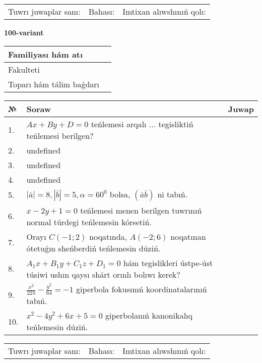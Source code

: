 \documentclass{article}
\begin{document}
\vspace{0.7cm}

\begin{tabular}{lll}
Tuwrı juwaplar sanı: \underline{\hspace{1cm}} & 
Bahası: \underline{\hspace{1cm}} & 
Imtixan alıwshınıń qolı: \underline{\hspace{2cm}} \\
\end{tabular}

\egroup

\newpage


\textbf{100-variant}\\

\bgroup
\def\arraystretch{1.6} %

\begin{tabular}{|m{5.7cm}|m{9.5cm}|}
\hline
Familiyası hám atı & \\
\hline
Fakulteti  & \\
\hline
Toparı hám tálim baǵdarı  & \\
\hline
\end{tabular}

\vspace{0.7cm}

\begin{tabular}{|m{0.7cm}|m{10cm}|m{4cm}|}
\hline
№ & Soraw & Juwap \\
\hline
1. & \(Ax + By + D = 0\) teńlemesi arqalı ... tegisliktiń teńlemesi berilgen? &  \\
\hline
2. & undefined &  \\
\hline
3. & undefined &  \\
\hline
4. & undefined &  \\
\hline
5. & \(\left| \bar{a} \right| = 8, \left| \bar{b} \right| = 5, \alpha = 60^{0}\) bolsa, \(( \bar{a}\bar{b} )\) ni tabıń. &  \\
\hline
6. & \(x - 2 y + 1 = 0\) teńlemesi menen berilgen tuwrınıń normal túrdegi teńlemesin kórsetiń. &  \\
\hline
7. & Orayı \(C (- 1;2)\) noqatında, \(A (- 2;6 )\) noqatınan ótetuǵın sheńberdiń teńlemesin dúziń. &  \\
\hline
8. & \(A_{1}x + B_{1}y + C_{1}z + D_{1} = 0\) hám tegislikleri ústpe-úst túsiwi ushın qaysı shárt orınlı bolıwı kerek? &  \\
\hline
9. & \(\frac{x^{2}}{225} - \frac{y^{2}}{64} = - 1\) giperbola fokusınıń koordinatalarınıń tabıń. &  \\
\hline
10. & \(x^{2} - 4 y^{2} + 6 x + 5 = 0\) giperbolanıń kanonikalıq teńlemesin dúziń. & \\
\hline
\end{tabular}

\vspace{0.7cm}

\begin{tabular}{lll}
Tuwrı juwaplar sanı: \underline{\hspace{1cm}} & 
Bahası: \underline{\hspace{1cm}} & 
Imtixan alıwshınıń qolı: \underline{\hspace{2cm}} \\
\end{tabular}

\egroup

\newpage
\end{document}
